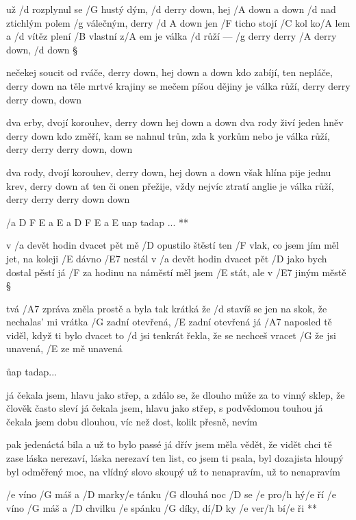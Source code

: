 
už /d rozplynul se /G hustý dým, /d derry down, hej /A down a down
/d nad ztichlým polem /g válečným, derry /{d A} down
jen /F ticho stojí /C kol ko/A lem a /d vítěz plení /B vlastní z/A em
je válka /d růží --- /g derry derry /A derry down, /d down \S

nečekej soucit od rváče, derry down, hej down a down
kdo zabíjí, ten nepláče, derry down
na těle mrtvé krajiny se mečem píšou dějiny
je válka růží, derry derry derry down, down \s

dva erby, dvojí korouhev, derry down hej down a down
dva rody živí jeden hněv derry down
kdo změří, kam se nahnul trůn, zda k yorkům nebo 
je válka růží, derry derry derry down, down \s

dva rody, dvojí korouhev, derry down, hej down a down
však hlína pije jednu krev, derry down
ať ten či onen přežije, vždy nejvíc ztratí anglie
je válka růží, derry derry derry down down




\R  /{a D F E a E a D F E a E} uap tadap ... **

v /a devět hodin dvacet pět mě /D opustilo štěstí
ten /F vlak, co jsem jím měl jet, na koleji /E dávno /E7 nestál
v /a devět hodin dvacet pět /D jako bych dostal pěstí
já /F za hodinu na náměstí měl jsem /E stát, ale v /E7 jiným městě \S

tvá /A7 zpráva zněla prostě a byla tak krátká
že /d stavíš se jen na skok, že nechalas' mi vrátka
/G zadní otevřená, /E zadní otevřená
já /A7 naposled tě viděl, když ti bylo dvacet
to /d jsi tenkrát řekla, že se nechceš vracet
/G že jsi unavená, /E ze mě unavená

\r uap tadap...

já čekala jsem, hlavu jako střep, a zdálo se, že dlouho
může za to vinný sklep, že člověk často sleví
já čekala jsem, hlavu jako střep, s podvědomou touhou
já čekala jsem dobu dlouhou, víc než dost, kolik přesně, nevím \s

pak jedenáctá bila a už to bylo passé
já dřív jsem měla vědět, že vidět chci tě zase
láska nerezaví, láska nerezaví
ten list, co jsem ti psala, byl dozajista hloupý
byl odměřený moc, na vlídný slovo skoupý
už to nenapravím, už to nenapravím

\rr




\R  /e víno /G máš a /D marky/e tánku
    /G dlouhá noc /D se /e pro/h hý/e ří
   /e víno /G máš a /D chvilku /e spánku
    /G díky, dí/D ky /e ver/h bí/e ři **

